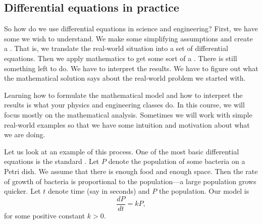 \subsection{Differential equations in practice}

\begin{mywrapfigsimp}{3.05in}{3.35in}
\noindent
{}
\diffypdfversion{\par\vspace*{5pt}}
\end{mywrapfigsimp}
So how do we use differential equations in science and engineering?  
First, we have some \emph{} we wish
to understand.
We make some simplifying assumptions and create a
\emph{}.
That is, we translate the real-world situation into a
set of differential equations.
Then we apply mathematics to get some sort of a
\emph{}.
There is still something left to do.  We have to interpret the results.
We have to figure out what the mathematical solution says about the real-world
problem we started with.

Learning how to formulate the mathematical model and how to interpret the
results is what your physics and engineering classes do.  In this
course, we will focus mostly on the mathematical analysis.  Sometimes we will
work with simple real-world examples so that we have some intuition and
motivation about what we are doing.

Let us look at 
an example of this process.
One of the most basic differential equations
is the standard \emph{}.
Let $P$ denote the population 
of some bacteria on a Petri dish.  We assume that there is enough food
and enough space.  Then the rate of growth of bacteria is proportional
to the population---a large population grows quicker.  Let $t$ denote
time (say in seconds) and $P$ the population.  Our model
is
\begin{equation*}
\frac{dP}{dt} = kP ,
\end{equation*}
for some positive constant $k > 0$.


